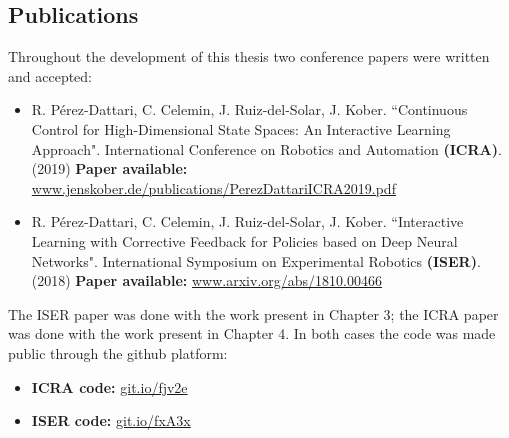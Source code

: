 \begin{appendix2}
\section*{Publications}
Throughout the development of this thesis two conference papers were written and accepted:

\begin{itemize}
    \item R. Pérez-Dattari, C. Celemin, J. Ruiz-del-Solar, J. Kober. ``Continuous Control for High-Dimensional State Spaces: An Interactive Learning Approach". International Conference on Robotics and Automation \textbf{(ICRA)}. (2019)
    \newline\color{blue}\textbf{Paper available:} \color{black} \url{www.jenskober.de/publications/PerezDattariICRA2019.pdf}
    
    \vspace{0.5cm}
    
    \item R. Pérez-Dattari, C. Celemin, J. Ruiz-del-Solar, J. Kober. ``Interactive Learning with Corrective Feedback for Policies based on Deep Neural Networks". International Symposium on Experimental Robotics \textbf{(ISER)}. (2018)
    \newline\color{blue}\textbf{Paper available:} \color{black} \url{www.arxiv.org/abs/1810.00466}
\end{itemize}

The ISER paper was done with the work present in Chapter 3; the ICRA paper was done with the work present in Chapter 4. In both cases the code was made public through the github platform:

\begin{itemize}
    \item \textbf{ICRA code:} \url{git.io/fjv2e}
    
    \vspace{0.5cm}
    
    \item \textbf{ISER code:} \url{git.io/fxA3x}
\end{itemize}
\end{appendix2}